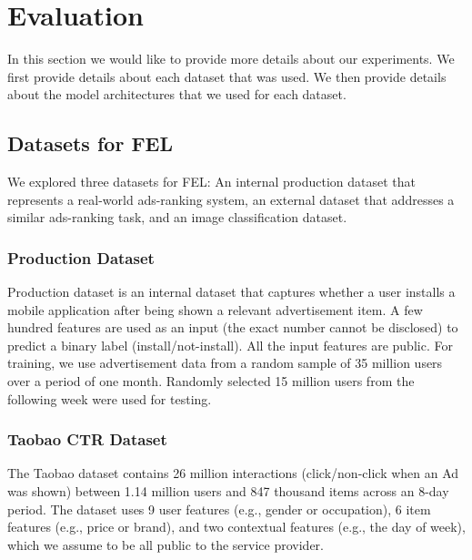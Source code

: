 \documentclass{article}
\begin{document}





\section{Evaluation}
In this section we would like to provide more details about our experiments. We first provide details about each dataset that was used. We then provide details about the model architectures that we used for each dataset.  
\subsection{Datasets for FEL}
\label{sec:datasets}
We explored three datasets for FEL: An internal production dataset that represents a real-world ads-ranking system, an external dataset that addresses a similar ads-ranking task, and an image classification dataset.

\subsubsection{Production Dataset}
Production dataset is an internal dataset that captures whether a user installs a mobile application after being shown a relevant advertisement item. A few hundred features are used as an input (the exact number cannot be disclosed) to predict a binary label (install/not-install). All the input features are public. For training, we use advertisement data from a random sample of 35 million users over a period of one month. Randomly selected 15 million users from the following week were used for testing.  


\subsubsection{Taobao CTR Dataset}
The Taobao dataset contains 26 million interactions (click/non-click when an Ad was shown) between 1.14 million users and 847 thousand items across an 8-day period. 
The dataset uses 9 user features (e.g., gender or occupation), 6 item features (e.g., price or brand), and two contextual features (e.g., the day of week), which we assume to be all public to the service provider. 
\end{document}

